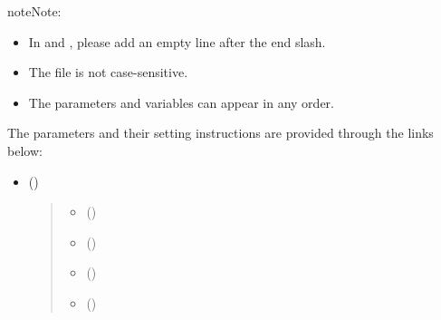 \documentclass[letterpaper,10pt,english]{sphinxmanual}
\begin{document}
\begin{sphinxadmonition}{note}{Note:}\begin{itemize}
\item {} 
In  and , please add an empty line after the end slash.

\item {} 
The file is not case-sensitive.

\item {} 
The parameters and variables can appear in any order.

\end{itemize}
\end{sphinxadmonition}

The parameters and their setting instructions are provided through the links below:
\begin{itemize}
\item {} 
{\hyperref[\detokenize{input_files/RunControl/Model_run_options:model-run-options}]{}} ()
\begin{quote}
\begin{itemize}\setlength{\itemsep}{0pt}\setlength{\parskip}{0pt}
\item {} 
{\hyperref[\detokenize{input_files/RunControl/Model_run_options:cmdoption-arg-cbluse}]{}} ()

\item {} 
{\hyperref[\detokenize{input_files/RunControl/Model_run_options:cmdoption-arg-snowuse}]{}} ()

\item {} 
{\hyperref[\detokenize{input_files/RunControl/Model_run_options:cmdoption-arg-solweiguse}]{}} ()

\item {} 
{\hyperref[\detokenize{input_files/RunControl/Model_run_options:cmdoption-arg-netradiationmethod}]{}} ()


\end{itemize}
\end{quote}
\end{itemize}
\end{document}
